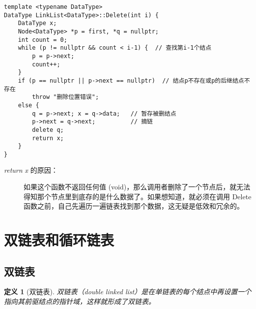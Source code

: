 \documentclass[12pt,a4paper]{amsart}
\newtheorem{definition}{定义}[section]
\begin{document}
\begin{center}
\end{center}

\begin{lstlisting}[caption=单链表删除操作实现]
template <typename DataType>
DataType LinkList<DataType>::Delete(int i) {
    DataType x;
    Node<DataType> *p = first, *q = nullptr;
    int count = 0;
    while (p != nullptr && count < i-1) {  // 查找第i-1个结点
        p = p->next;
        count++;
    }
    if (p == nullptr || p->next == nullptr)  // 结点p不存在或p的后继结点不存在
        throw "删除位置错误";
    else {
        q = p->next; x = q->data;   // 暂存被删结点
        p->next = q->next;          // 摘链
        delete q;
        return x;
    }
}
\end{lstlisting}

\begin{description}
    \item[\textit{return x} 的原因：] 如果这个函数不返回任何值 (void)，那么调用者删除了一个节点后，就无法得知那个节点里到底存的是什么数据了。如果想知道，就必须在调用 Delete 函数之前，自己先遍历一遍链表找到那个数据，这无疑是低效和冗余的。
\end{description}

\section{双链表和循环链表}

\subsection{双链表}

\begin{definition}[双链表]
双链表（double linked list）是在单链表的每个结点中再设置一个指向其前驱结点的指针域，这样就形成了双链表。
\end{definition}
\end{document}
